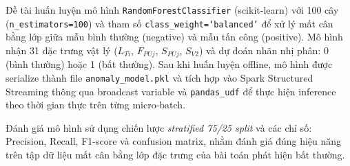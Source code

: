 Đề tài huấn luyện mô hình \texttt{RandomForestClassifier} (scikit-learn) với
100 cây (\texttt{n\_estimators=100}) và tham số \texttt{class\_weight=`balanced'}
để xử lý mất cân bằng lớp giữa mẫu bình thường (negative) và mẫu tấn công
(positive). Mô hình nhận 31 đặc trưng vật lý ($L_{Ti}$, $F_{PUj}$, $S_{PUj}$,
$S_{V2}$) và dự đoán nhãn nhị phân: 0 (bình thường) hoặc 1 (bất thường). Sau khi
huấn luyện offline, mô hình được serialize thành file \texttt{anomaly\_model.pkl}
và tích hợp vào Spark Structured Streaming thông qua broadcast variable và
\texttt{pandas\_udf} để thực hiện inference theo thời gian thực trên từng
micro-batch.

Đánh giá mô hình sử dụng chiến lược \emph{stratified 75/25 split} và các chỉ số:
Precision, Recall, F1-score và confusion matrix, nhằm đánh giá đúng hiệu năng
trên tập dữ liệu mất cân bằng lớp đặc trưng của bài toán phát hiện bất thường.
